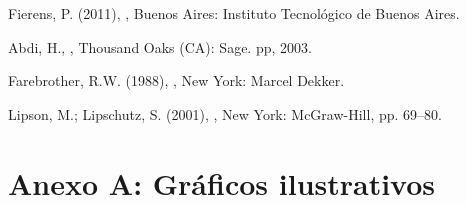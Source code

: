 \documentclass[%
	final,
	reprint,
	notitlepage,
	narroweqnarray,
	inline,
	twoside,
	invited
	]{ieee}
\begin{document}
%
%
%
%
%

\clearpage

\begin{thebibliography}{1}

Fierens, P. (2011),
,
\newblock Buenos Aires: Instituto Tecnológico de Buenos Aires.

Abdi, H.,
,
\newblock Thousand Oaks (CA): Sage. pp, 2003.

Farebrother, R.W. (1988),
, \newblock New York: Marcel Dekker.

Lipson, M.; Lipschutz, S. (2001),
, 
\newblock New York: McGraw-Hill, pp. 69–80.


\end{thebibliography}



\clearpage

\onecolumn

\onecolumn
\section*{Anexo A: Gráficos ilustrativos}
\end{document}
